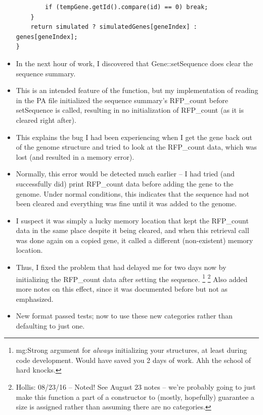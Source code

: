 \documentclass[12pt,hyperref]{labbook}
\begin{document}
\begin{itemize}
\begin{lstlisting}
		if (tempGene.getId().compare(id) == 0) break;
	}
	return simulated ? simulatedGenes[geneIndex] : genes[geneIndex];
}
    \end{lstlisting}
	\item In the next hour of work, I discovered that Gene::setSequence does clear the sequence summary.
	\item This is an intended feature of the function, but my implementation of reading in the PA file initialized the sequence summary's RFP\_count before setSequence is called, resulting in no initialization of RFP\_count (as it is cleared right after).
	\item This explains the bug I had been experiencing when I get the gene back out of the genome structure and tried to look at the RFP\_count data, which was lost (and resulted in a memory error).
	\item Normally, this error would be detected much earlier -- I had tried (and successfully did) print RFP\_count data before adding the gene to the genome.
	Under normal conditions, this indicates that the sequence had not been cleared and everything was fine until it was added to the genome.
	\item I suspect it was simply a lucky memory location that kept the RFP\_count data in the same place despite it being cleared, and when this retrieval call was done again on a copied gene, it called a different (non-existent) memory location.
	\item Thus, I fixed the problem that had delayed me for two days now by initializing the RFP\_count data after setting the sequence.
\footnote{mg:Strong argument for \emph{always} initializing your structures, at least during code development.
Would have saved you 2 days of work.
Ahh the school of hard knocks.
}
\footnote{Hollis: 08/23/16 -- Noted! See August 23 notes -- we're probably going to just make this function a part of a constructor to (mostly, hopefully) guarantee a size is assigned rather than assuming there are no categories.}
	Also added more notes on this effect, since it was documented before but not as emphasized.
	\item New format passed tests; now to use these new categories rather than defaulting to just one.
\end{itemize}

\end{document}
